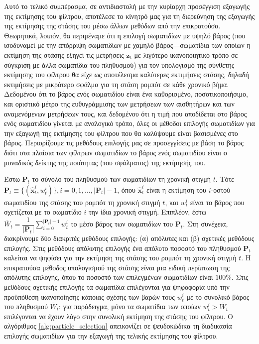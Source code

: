Αυτό το τελικό συμπέρασμα, σε αντιδιαστολή με την κυρίαρχη προσέγγιση εξαγωγής
της εκτίμησης του φίλτρου, αποτέλεσε το κίνητρό μας για τη διερεύνηση της
εξαγωγής της εκτίμησης της στάσης του μέσω άλλων μεθόδων από την επικρατούσα.
Θεωρητικά, λοιπόν, θα περιμέναμε ότι η επιλογή σωματιδίων με υψηλό βάρος (που
ισοδυναμεί με την απόρριψη σωματιδίων με χαμηλό βάρος---σωματίδια των οποίων η
εκτίμηση της στάσης εξηγεί τις μετρήσεις $\bm{z}_t$ με λιγότερο ικανοποιητικό
τρόπο σε σύγκριση με άλλα σωματίδια του πληθυσμού) για τον υπολογισμό της
σύνθετης εκτίμησης του φίλτρου θα είχε ως αποτέλεσμα καλύτερες εκτιμήσεις
στάσης, δηλαδή εκτιμήσεις με μικρότερο σφάλμα για τη στάση ρομπότ σε κάθε
χρονικό βήμα. Δεδομένου ότι το βάρος ενός σωματιδίου είναι ένα καθορισμένο,
ποσοτικοποιήσιμο, και οριστικό μέτρο της ευθυγράμμισης των μετρήσεων των
αισθητήρων και των αναμενόμενων μετρήσεων τους, και δεδομένου ότι η τιμή που
αποδίδεται στο βάρος ενός σωματιδίου γίνεται με αναλογικό τρόπο, όλες οι
μέθοδοι επιλογής σωματιδίων για την εξαγωγή της εκτίμησης του φίλτρου που θα
καλύψουμε είναι βασισμένες στο βάρος. Περιορίζουμε τις μεθόδους επιλογής μας σε
προσεγγίσεις με βάση το βάρος διότι στα πλαίσια των φίλτρων σωματιδίων το βάρος
ενός σωματιδίου είναι ο μοναδικός δείκτης της ποιότητας (του σφάλματος) της
εκτίμησής του.

Έστω $\bm{P}_t$ το σύνολο του πληθυσμού των σωματιδίων τη χρονική στιγμή $t$.
Τότε $\bm{P}_t \equiv \{(\hat{\bm{x}}_t^i, w_t^i)\}, i =
0,1,\dots,|\bm{P}_t|-1$, όπου $\hat{\bm{x}}_t^i$ είναι η εκτίμηση του $i$-οστού
σωματιδίου της στάσης του ρομπότ τη χρονική στιγμή $t$, και $w_t^i$ είναι το
βάρος που σχετίζεται με το σωματίδιο $i$ την ίδια χρονική στιγμή.  Επιπλέον,
έστω $\overline{W}_t = \dfrac{1}{|\bm{P}_t|}\sum\limits_{i=0}^{|\bm{P}_t|-1}
w_t^i$ το μέσο βάρος των σωματιδίων του $\bm{P}_t$. Στη συνέχεια, διακρίνουμε
δύο διακριτές μεθόδους επιλογής: (α) απόλυτες και (β) σχετικές μεθόδους
επιλογής.  Στις μεθόδους απόλυτης επιλογής ένα απόλυτο ποσοστό του πληθυσμού
$\bm{P}_t$ καλείται να ψηφίσει για την εκτίμηση της στάσης του ρομπότ τη
χρονική στιγμή $t$. Η επικρατούσα μέθοδος υπολογισμού της στάσης είναι μια
ειδική περίπτωση της απόλυτης επιλογής, όπου το ποσοστό των επιλεγμένων
σωματιδίων είναι $100\%$.  Στις μεθόδους σχετικής επιλογής τα σωματίδια
επιλέγονται για ψηφοφορία υπό την προϋπόθεση ικανοποίησης κάποιας σχέσης των
βαρών τους $w_t^i$ με το συνολικό βάρος του πληθυσμού $\overline{W}_t$: για
παράδειγμα, μόνο τα σωματίδια των οποίων $w_t^i > \overline{W}_t$ επιλέγονται
να έχουν λόγο στην συνολική εκτίμηση της στάσης του φίλτρου. Ο αλγόριθμος
\ref{alg:particle_selection} απεικονίζει σε ψευδοκώδικα τη διαδικασία επιλογής
σωματιδίων για την εξαγωγή της τελικής εκτίμησης του φίλτρου.

